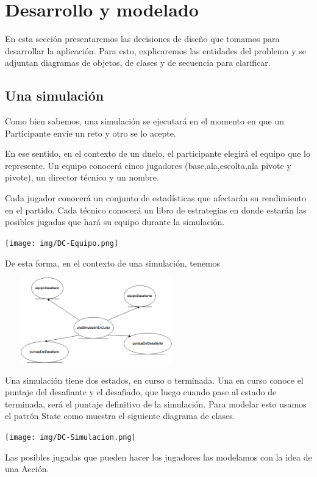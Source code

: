 \section{Desarrollo y modelado}

En esta sección presentaremos las decisiones de diseño que tomamos para desarrollar la aplicación. Para esto, explicaremos las entidades del problema y se adjuntan diagramas de objetos, de clases y de secuencia para clarificar.

\subsection{Una simulación}

Como bien sabemos, una simulación se ejecutará en el momento en que un Participante envíe un reto y otro se lo acepte.

En ese sentido, en el contexto de un duelo, el participante elegirá el equipo que lo represente. Un equipo conocerá cinco jugadores (base,ala,escolta,ala pivote y pivote), un director técnico y un nombre. 

Cada jugador conocerá un conjunto de estadísticas que afectarán su rendimiento en el partido.
Cada técnico conocerá un libro de estrategias en donde estarán las posibles jugadas que hará su equipo durante la simulación.


\begin{center}
\texttt{[image: img/DC-Equipo.png]} 
\end{center}


De esta forma, en el contexto de una simulación, tenemos 

\begin{center}
\includegraphics[height=140px, width=300px]{img/DO-SimulacionEnCurso.png} 
\end{center}


Una simulación tiene dos estados, en curso o terminada. Una en curso conoce el puntaje del desafiante y el desafiado, que luego cuando pase al estado de terminada, será el puntaje definitivo de la simulación.
Para modelar esto usamos el patrón State como muestra el siguiente diagrama de clases.

\begin{center}
\texttt{[image: img/DC-Simulacion.png]}
\end{center}


Las posibles jugadas que pueden hacer los jugadores las modelamos con la idea de una Acción.
